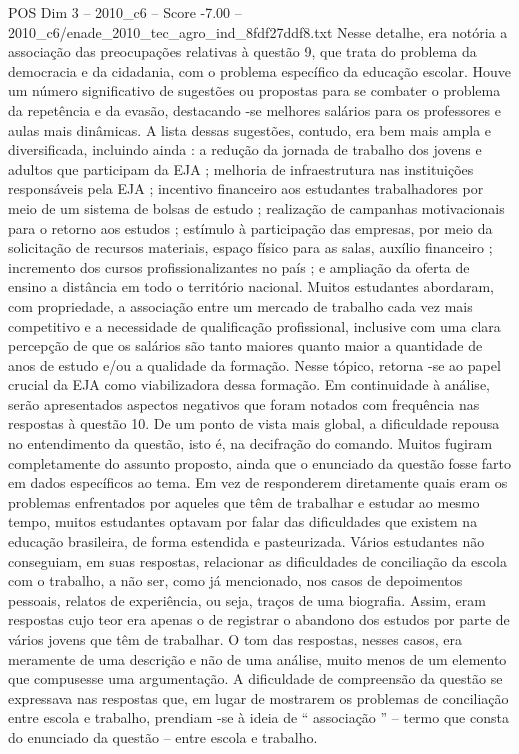 \begin{textsample}{POS Dim 3 – 2010\_c6 – Score -7.00 – 2010\_c6/enade\_2010\_tec\_agro\_ind\_8fdf27ddf8.txt}
Nesse detalhe, era notória a associação das preocupações relativas à questão 9, que trata do problema da democracia e da cidadania, com o problema específico da educação escolar.
Houve um número significativo de sugestões ou propostas para se combater o problema da repetência e da evasão, destacando -se melhores salários para os professores e aulas mais dinâmicas.
A lista dessas sugestões, contudo, era bem mais ampla e diversificada, incluindo ainda : a redução da jornada de trabalho dos jovens e adultos que participam da EJA ; melhoria de infraestrutura nas instituições responsáveis pela EJA ; incentivo financeiro aos estudantes trabalhadores por meio de um sistema de bolsas de estudo ; realização de campanhas motivacionais para o retorno aos estudos ; estímulo à participação das empresas, por meio da solicitação de recursos materiais, espaço físico para as salas, auxílio financeiro ; incremento dos cursos profissionalizantes no país ; e ampliação da oferta de ensino a distância em todo o território nacional.
Muitos estudantes abordaram, com propriedade, a associação entre um mercado de trabalho cada vez mais competitivo e a necessidade de qualificação profissional, inclusive com uma clara percepção de que os salários são tanto maiores quanto maior a quantidade de anos de estudo e/ou a qualidade da formação.
Nesse tópico, retorna -se ao papel crucial da EJA como viabilizadora dessa formação.
Em continuidade à análise, serão apresentados aspectos negativos que foram notados com frequência nas respostas à questão 10.
De um ponto de vista mais global, a dificuldade repousa no entendimento da questão, isto é, na decifração do comando.
Muitos fugiram completamente do assunto proposto, ainda que o enunciado da questão fosse farto em dados específicos ao tema.
Em vez de responderem diretamente quais eram os problemas enfrentados por aqueles que têm de trabalhar e estudar ao mesmo tempo, muitos estudantes optavam por falar das dificuldades que existem na educação brasileira, de forma estendida e pasteurizada.
Vários estudantes não conseguiam, em suas respostas, relacionar as dificuldades de conciliação da escola com o trabalho, a não ser, como já mencionado, nos casos de depoimentos pessoais, relatos de experiência, ou seja, traços de uma biografia.
Assim, eram respostas cujo teor era apenas o de registrar o abandono dos estudos por parte de vários jovens que têm de trabalhar.
O tom das respostas, nesses casos, era meramente de uma descrição e não de uma análise, muito menos de um elemento que compusesse uma argumentação.
A dificuldade de compreensão da questão se expressava nas respostas que, em lugar de mostrarem os problemas de conciliação entre escola e trabalho, prendiam -se à ideia de “ associação ” – termo que consta do enunciado da questão – entre escola e trabalho.

\end{textsample}
